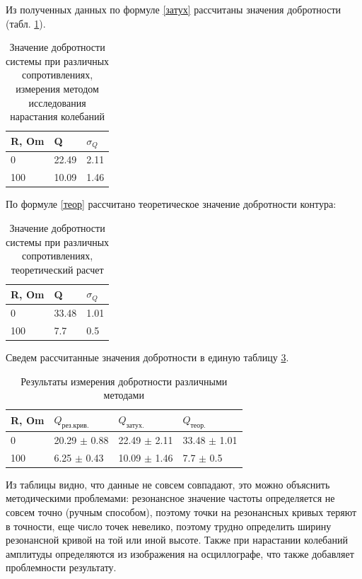 \documentclass[a4paper,12pt]{article} %
\begin{document}
Из полученных данных по формуле \ref{затух} рассчитаны значения добротности (табл. \ref{затух_тбл}).
\begin{table}[h!]
\caption{Значение добротности системы при различных сопротивлениях, измерения методом исследования нарастания колебаний}
\label{затух_тбл}
\begin{tabular}{|l|l|l|}
\hline
R, Om & Q     & $\sigma_Q$ \\ \hline
0     & 22.49 & 2.11       \\ \hline
100   & 10.09 & 1.46       \\ \hline
\end{tabular}
\end{table}

По формуле \ref{теор} рассчитано теоретическое значение добротности контура:
\begin{table}[h!]
\caption{Значение добротности системы при различных сопротивлениях, теоретический расчет}
\label{теор_тбл}
\begin{tabular}{|l|l|l|}
\hline
R, Om & Q     & $\sigma_Q$ \\ \hline
0     & 33.48 & 1.01       \\ \hline
100   & 7.7 & 0.5       \\ \hline
\end{tabular}
\end{table}

Сведем рассчитанные значения добротности в единую таблицу \ref{един}.
\begin{table}[h!]
\caption{Результаты измерения добротности различными методами}
\label{един}
\begin{tabular}{|l|l|l|l|}
\hline
R, Om & $Q_{рез.крив.}$  & $Q_{затух.}$     & $Q_{теор.}$      \\ \hline
0     & 20.29 $\pm$ 0.88 & 22.49 $\pm$ 2.11 & 33.48 $\pm$ 1.01 \\ \hline
100   & 6.25 $\pm$ 0.43  & 10.09 $\pm$ 1.46 & 7.7 $\pm$ 0.5    \\ \hline
\end{tabular}
\end{table}

Из таблицы видно, что данные не совсем совпадают, это можно объяснить методическими проблемами: резонансное значение частоты определяется не совсем точно (ручным способом), поэтому точки на резонансных кривых теряют в точности, еще число точек невелико, поэтому трудно определить ширину резонансной кривой на той или иной высоте. Также при нарастании колебаний амплитуды определяются из изображения на осциллографе, что также добавляет проблемности результату.
\end{document}

